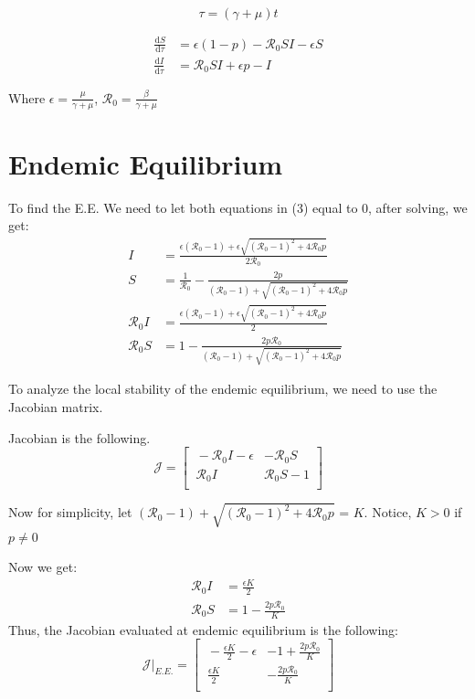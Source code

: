 \documentclass[12pt]{article}
\newcommand\dbyd[2]{\frac{\mathrm d{#1}}{\mathrm d{#2}}}
\newcommand{\R}{\mathcal{R}}
\begin{document}
\begin{equation}
\tau=(\gamma+\mu)t
\end{equation}

\begin{equation}
\begin{split}
\dbyd{S}{\tau}&=\epsilon(1-p)- \R_0  SI-\epsilon S \\
\dbyd{I}{\tau}&=\R_0 SI+\epsilon p-I
\end{split}
\end{equation}

Where $\epsilon=\frac{\mu}{\gamma+\mu}$, $\R_0=\frac{\beta}{\gamma+\mu}$ 
\section{Endemic Equilibrium}
To find the E.E. We need to let both equations in (3) equal to 0, after solving, we get:
\begin{align}
I &= \frac{\epsilon(\R_0 -1)+ \epsilon \sqrt{(\R_0-1)^2+4\R_0 p}}{2\R_0}\\
S &=\frac{1}{\R_0}-\frac{2p}{(\R_0 -1)+ \sqrt{(\R_0-1)^2+4\R_0 p}}\\
\R_0 I &= \frac{\epsilon(\R_0 -1)+ \epsilon \sqrt{(\R_0-1)^2+4\R_0 p}}{2}\\
\R_0 S &= 1-\frac{2p \R_0}{(\R_0 -1)+ \sqrt{(\R_0-1)^2+4\R_0 p}}
\end{align}

To analyze the local stability of the endemic equilibrium, we need to use the Jacobian matrix.

Jacobian is the following.
\begin{equation}
\mathcal{J} =
\begin{bmatrix}
    \ -\R_0 I-\epsilon       & -\R_0 S \\
    \ \R_0 I       & \R_0 S-1 \\
\end{bmatrix}
\end{equation}

Now for simplicity, let $(\R_0 -1)+ \sqrt{(\R_0-1)^2+4\R_0 p}$ = $K$. Notice, $K>0$ if $p\neq 0$

Now we get:
\begin{align}
\R_0 I &= \frac{\epsilon K}{2}\\
\R_0 S &= 1-\frac{2p \R_0}{K}
\end{align}
Thus, the Jacobian evaluated at endemic equilibrium is the following:
\begin{equation}
\mathcal{J}|_{E.E.} =
\begin{bmatrix}
    \ -\frac{\epsilon K}{2}-\epsilon       & -1+\frac{2p \R_0}{K} \\
    \ \frac{\epsilon K}{2}       & -\frac{2p \R_0}{K} \\
\end{bmatrix}
\end{equation}
\end{document}
